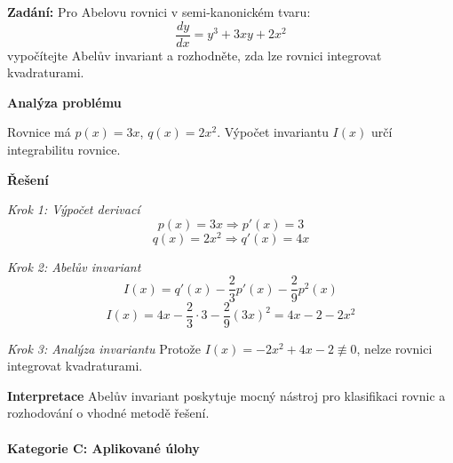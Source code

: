 \begin{example}
\label{ex:abel-invarianty}

\noindent\textbf{Zadání:} Pro Abelovu rovnici v semi-kanonickém tvaru:
\[
\frac{dy}{dx} = y^3 + 3x y + 2x^2
\]
vypočítejte Abelův invariant a rozhodněte, zda lze rovnici integrovat kvadraturami.

\vspace{1.5\baselineskip}

\noindent\textbf{Analýza problému}

Rovnice má $p(x) = 3x$, $q(x) = 2x^2$. Výpočet invariantu $I(x)$ určí integrabilitu rovnice.

\vspace{1.5\baselineskip}

\noindent\textbf{Řešení}

\noindent\textit{Krok 1: Výpočet derivací}
\[
p(x) = 3x \Rightarrow p'(x) = 3
\]
\[
q(x) = 2x^2 \Rightarrow q'(x) = 4x
\]

\vspace{1\baselineskip}

\noindent\textit{Krok 2: Abelův invariant}
\[
I(x) = q'(x) - \frac{2}{3}p'(x) - \frac{2}{9}p^2(x)
\]
\[
I(x) = 4x - \frac{2}{3}\cdot 3 - \frac{2}{9}(3x)^2 = 4x - 2 - 2x^2
\]

\vspace{1\baselineskip}

\noindent\textit{Krok 3: Analýza invariantu}
Protože $I(x) = -2x^2 + 4x - 2 \not\equiv 0$, nelze rovnici integrovat kvadraturami.

\vspace{1.5\baselineskip}

\noindent\textbf{Interpretace}
Abelův invariant poskytuje mocný nástroj pro klasifikaci rovnic a rozhodování o vhodné metodě řešení.

\end{example}

\paragraph*{Kategorie C: Aplikované úlohy}

